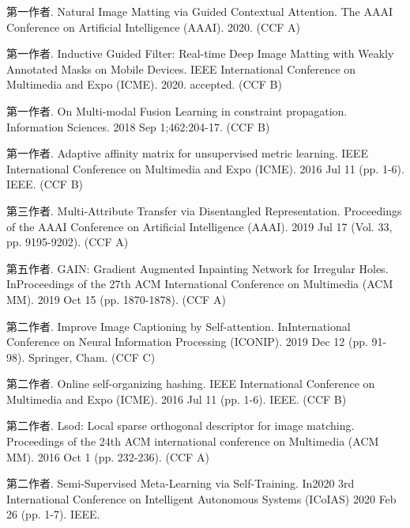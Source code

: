 \begin{publications*}
  \item 第一作者. Natural Image Matting via Guided Contextual Attention. The AAAI Conference on Artificial Intelligence (AAAI). 2020. (CCF A)
  \item 第一作者. Inductive Guided Filter: Real-time Deep Image Matting with Weakly Annotated Masks on Mobile Devices. IEEE International Conference on Multimedia and Expo (ICME). 2020. accepted. (CCF B)
  \item 第一作者. On Multi-modal Fusion Learning in constraint propagation. Information Sciences. 2018 Sep 1;462:204-17. (CCF B)
  \item 第一作者. Adaptive affinity matrix for unsupervised metric learning. IEEE International Conference on Multimedia and Expo (ICME). 2016 Jul 11 (pp. 1-6). IEEE. (CCF B)
  \item 第三作者. Multi-Attribute Transfer via Disentangled Representation. Proceedings of the AAAI Conference on Artificial Intelligence (AAAI). 2019 Jul 17 (Vol. 33, pp. 9195-9202). (CCF A)
  \item 第五作者. GAIN: Gradient Augmented Inpainting Network for Irregular Holes. InProceedings of the 27th ACM International Conference on Multimedia (ACM MM). 2019 Oct 15 (pp. 1870-1878). (CCF A)
  \item 第二作者. Improve Image Captioning by Self-attention. InInternational Conference on Neural Information Processing (ICONIP). 2019 Dec 12 (pp. 91-98). Springer, Cham. (CCF C)
  \item 第二作者. Online self-organizing hashing. IEEE International Conference on Multimedia and Expo (ICME). 2016 Jul 11 (pp. 1-6). IEEE. (CCF B)
  \item 第二作者. Lsod: Local sparse orthogonal descriptor for image matching. Proceedings of the 24th ACM international conference on Multimedia (ACM MM). 2016 Oct 1 (pp. 232-236). (CCF A)
  \item 第二作者. Semi-Supervised Meta-Learning via Self-Training. In2020 3rd International Conference on Intelligent Autonomous Systems (ICoIAS) 2020 Feb 26 (pp. 1-7). IEEE.

\end{publications*}

